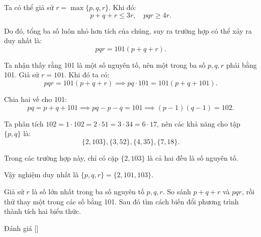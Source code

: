 \ifshowproblemandsoln
\ifshowproblem{}
\fi

\ifshowsoln
\begin{soln}\footnotemark
    Ta có thể giả sử \( r = \max\{p, q, r\} \). Khi đó:
    \[
        p + q + r \le 3r, \quad pqr \ge 4r.
    \]

    Do đó, tổng ba số luôn nhỏ hơn tích của chúng, suy ra trường hợp có thể xảy ra duy nhất là:
    \[
        pqr = 101(p + q + r).
    \]

    Ta nhận thấy rằng 101 là một số nguyên tố, nên một trong ba số \( p, q, r \) phải bằng 101. Giả sử \( r = 101 \). Khi đó ta có:
    \[
        pqr = 101(p + q + r) \implies pq \cdot 101 = 101(p + q + 101).
    \]

    Chia hai vế cho 101:
    \[
        pq = p + q + 101 \implies pq - p - q = 101 \implies (p - 1)(q - 1) = 102.
    \]

    Ta phân tích \( 102 = 1 \cdot 102 = 2 \cdot 51 = 3 \cdot 34 = 6 \cdot 17 \), nên các khả năng cho tập \( \{p, q\} \) là:
    \[
        \{2, 103\}, \{3, 52\}, \{4, 35\}, \{7, 18\}.
    \]

    Trong các trường hợp này, chỉ có cặp \( \{2, 103\} \) là cả hai đều là số nguyên tố.

    Vậy nghiệm duy nhất là \( \{p, q, r\} = \{2, 101, 103\} \).
\end{soln}
\fi

\ifshowhint
\begin{hint*}
    Giả sử \( r \) là số lớn nhất trong ba số nguyên tố \( p, q, r \). So sánh \( p + q + r \) và \( pqr \), rồi thử thay một trong các số bằng 101.
    Sau đó tìm cách biến đổi phương trình thành tích hai biểu thức.
\end{hint*}
\fi

\ifshowremark
\begin{remark*}
    Đánh giá [\textbf{}]
\end{remark*}
\newpage
\fi
